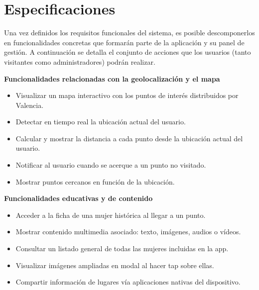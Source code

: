 \section{Especificaciones}
Una vez definidos los requisitos funcionales del sistema, es posible descomponerlos en funcionalidades concretas que formarán parte de la aplicación y su panel de gestión. A continuación se detalla el conjunto de acciones que los usuarios (tanto visitantes como administradores) podrán realizar.

\vspace{0.3cm}

\textbf{\textsf{\large Funcionalidades relacionadas con la geolocalización y el mapa}}

\vspace{0.3cm}

\begin{itemize}
    \item[F1.] Visualizar un mapa interactivo con los puntos de interés distribuidos por Valencia.
    \item[F2.] Detectar en tiempo real la ubicación actual del usuario.
    \item[F3.] Calcular y mostrar la distancia a cada punto desde la ubicación actual del usuario.
    \item[F4.] Notificar al usuario cuando se acerque a un punto no visitado.
    \item[F5.] Mostrar puntos cercanos en función de la ubicación.
\end{itemize}

\vspace{0.3cm}

\textbf{\textsf{\large Funcionalidades educativas y de contenido}}

\vspace{0.3cm}

\begin{itemize}
    \item[F6.] Acceder a la ficha de una mujer histórica al llegar a un punto.
    \item[F7.] Mostrar contenido multimedia asociado: texto, imágenes, audios o vídeos.
    \item[F8.] Consultar un listado general de todas las mujeres incluidas en la app.
    \item[F9.] Visualizar imágenes ampliadas en modal al hacer tap sobre ellas.
    \item[F10.] Compartir información de lugares vía aplicaciones nativas del dispositivo.
\end{itemize}

